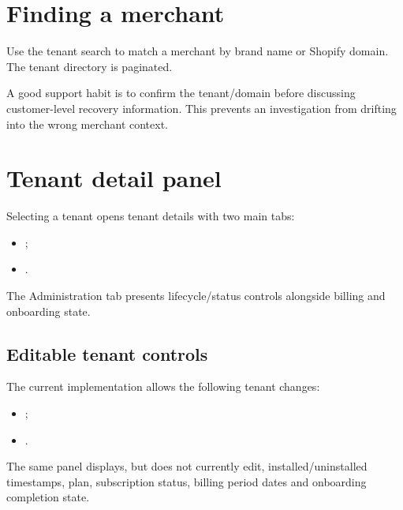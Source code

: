 
\section{Finding a merchant}
Use the tenant search to match a merchant by brand name or Shopify domain. The tenant directory is paginated.

A good support habit is to confirm the tenant/domain before discussing customer-level recovery information. This prevents an investigation from drifting into the wrong merchant context.


\section{Tenant detail panel}
Selecting a tenant opens tenant details with two main tabs:
\begin{itemize}
  \item {};
  \item {}.
\end{itemize}

The Administration tab presents lifecycle/status controls alongside billing and onboarding state.

\subsection{Editable tenant controls}
The current implementation allows the following tenant changes:
\begin{itemize}
  \item {};
  \item {}.
\end{itemize}

The same panel displays, but does not currently edit, installed/uninstalled timestamps, plan, subscription status, billing period dates and onboarding completion state.




